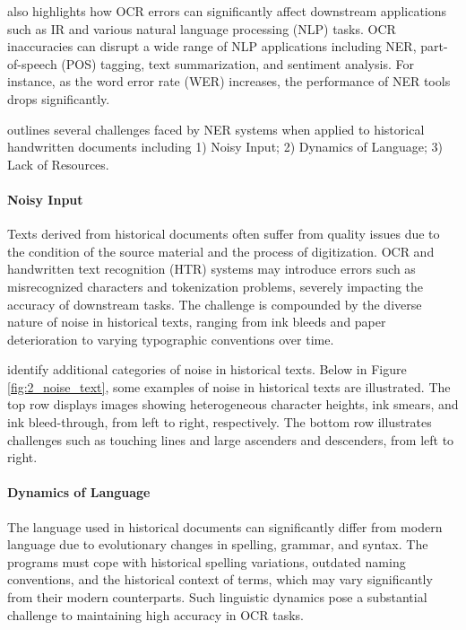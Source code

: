 \cite{nguyen2021survey} also highlights how OCR errors can significantly affect downstream applications such as IR and various natural language processing (NLP) tasks. OCR inaccuracies can disrupt a wide range of NLP applications including NER, part-of-speech (POS) tagging, text summarization, and sentiment analysis. For instance, as the word error rate (WER) increases, the performance of NER tools drops significantly.


\cite{ehrmann2023named} outlines several challenges faced by NER systems when applied to historical handwritten documents including 1) Noisy Input; 2) Dynamics of Language; 3) Lack of Resources. 

\paragraph*{Noisy Input}
\label{par:1_noisy_input}
Texts derived from historical documents often suffer from quality issues due to the condition of the source material and the process of digitization. OCR and handwritten text recognition (HTR) systems may introduce errors such as misrecognized characters and tokenization problems, severely impacting the accuracy of downstream tasks. The challenge is compounded by the diverse nature of noise in historical texts, ranging from ink bleeds and paper deterioration to varying typographic conventions over time. 

\cite{kurar2020learning} identify additional categories of noise in historical texts. Below in Figure \ref{fig:2_noise_text}, some examples of noise in historical texts are illustrated. The top row displays images showing heterogeneous character heights, ink smears, and ink bleed-through, from left to right, respectively. The bottom row illustrates challenges such as touching lines and large ascenders and descenders, from left to right.


\paragraph*{Dynamics of Language}
\label{par:1_dynamics_of_language}
The language used in historical documents can significantly differ from modern language due to evolutionary changes in spelling, grammar, and syntax. The programs must cope with historical spelling variations, outdated naming conventions, and the historical context of terms, which may vary significantly from their modern counterparts. Such linguistic dynamics pose a substantial challenge to maintaining high accuracy in OCR tasks.

